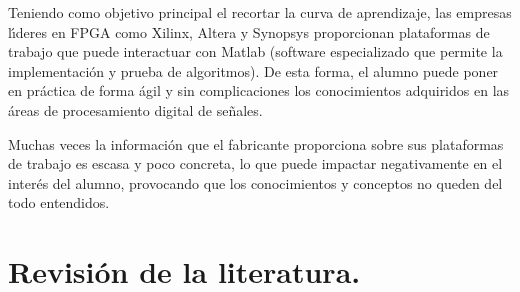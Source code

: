 Teniendo como objetivo principal el recortar la curva de aprendizaje,
las empresas l\'{\i}deres en FPGA como Xilinx, Altera y Synopsys proporcionan
plataformas de trabajo que puede interactuar con Matlab (software
especializado que permite la implementaci\'{o}n y prueba de algoritmos).
De esta forma, el alumno puede poner en pr\'{a}ctica de forma \'{a}gil
y sin complicaciones los conocimientos adquiridos en las \'{a}reas
de procesamiento digital de se\~{n}ales. 

Muchas veces la informaci\'{o}n que el fabricante proporciona sobre
sus plataformas de trabajo es escasa y poco concreta, lo que puede
impactar negativamente en el inter\'{e}s del alumno, provocando que
los conocimientos y conceptos no queden del todo entendidos. 

\section{Revisi\'{o}n de la literatura.}

